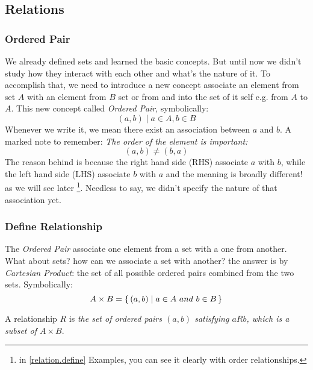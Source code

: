 \subsection{Relations}

\subsubsection{Ordered Pair}
We already defined sets and learned the basic concepts. But until now we didn't study how they interact with each other and what's the nature of it. To accomplish that, we need to introduce a new concept associate an element from set $A$ with an element from $B$ set or from and into the set of it self e.g. from $A$ to $A$.
This new concept called {\it Ordered Pair}, symbolically:
$$
    (a,b) \mid a \in A, b \in B
$$
Whenever we write it, we mean there exist an association between $a$ and $b$. A marked note to remember: {\it The order of the element is important:
$$
    (a,b) \neq (b,a)
$$
} The reason behind is because the right hand side (RHS) associate $a$ with $b$, while the left hand side (LHS) associate $b$ with $a$ and the meaning is broadly different! as we will see later \footnote{in \ref{relation.define} Examples, you can see it clearly with order relationships.}. Needless to say, we didn't specify the nature of that association yet.
\subsubsection{Define Relationship \label{relation.define}}
The {\it Ordered Pair} associate one element from a set with a one from another. What about sets? how can we associate a set with another? the answer is by {\it Cartesian Product}: the set of all possible ordered pairs combined from the two sets. Symbolically:
$$
A \times B = \set{(a,b) \mid a \in A \ and \  b \in B}
$$

A relationship $R$ is {\it the set of ordered pairs $(a,b)$ satisfying $aRb$, which is a subset of $A \times B$}. 
